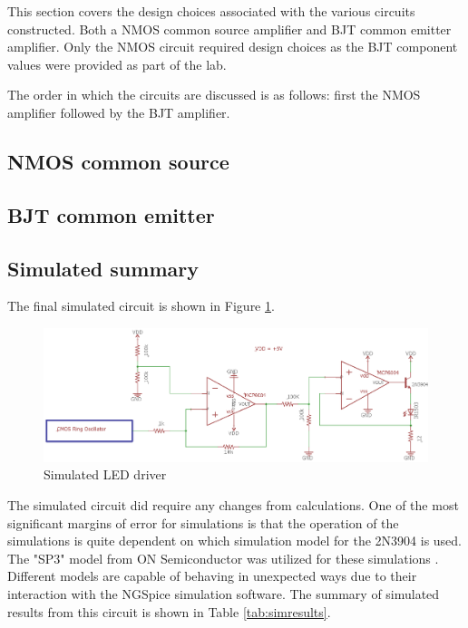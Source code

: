 



This section covers the design choices associated with the various circuits constructed. Both a NMOS common source amplifier and BJT common emitter amplifier. Only the NMOS circuit required design choices as the BJT component values were provided as part of the lab.

The order in which the circuits are discussed is as follows: first the NMOS amplifier followed by the BJT amplifier.


\subsection{NMOS common source}


\subsection{BJT common emitter}




\subsection{Simulated summary}
The final simulated circuit is shown in Figure \ref{fig:finalschemlab4}.

\begin{figure}[H]
	\centering
	\includegraphics[width=0.75\linewidth]{CircuitDevelopment/FinalschemLab4}
	\caption[Simulated circuit]{Simulated LED driver}
	\label{fig:finalschemlab4}
\end{figure}
The simulated circuit did require any changes from calculations. One of the most significant margins of error for simulations is that the operation of the simulations is quite dependent on which simulation model for the 2N3904 is used. The "SP3" model from ON Semiconductor was utilized for these simulations \cite{spice}. Different models are capable of behaving in unexpected ways due to their interaction with the NGSpice simulation software. The summary of simulated results from this circuit is shown in Table \ref{tab:simresults}.

